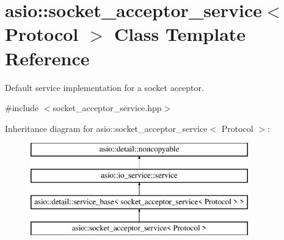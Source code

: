 \hypertarget{classasio_1_1socket__acceptor__service}{}\section{asio\+:\+:socket\+\_\+acceptor\+\_\+service$<$ Protocol $>$ Class Template Reference}
\label{classasio_1_1socket__acceptor__service}


Default service implementation for a socket acceptor.  




{\ttfamily \#include $<$socket\+\_\+acceptor\+\_\+service.\+hpp$>$}

Inheritance diagram for asio\+:\+:socket\+\_\+acceptor\+\_\+service$<$ Protocol $>$\+:\begin{figure}[H]
\begin{center}
\leavevmode
\includegraphics[height=4.000000cm]{classasio_1_1socket__acceptor__service}
\end{center}
\end{figure}
